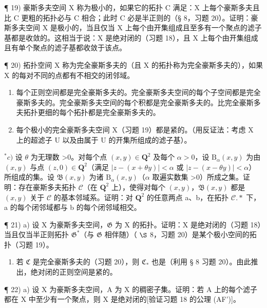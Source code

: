 ¶ 19) 豪斯多夫空间 X 称为极小的，如果它的拓扑 C 满足：X 上每个豪斯多夫且比 C 更粗的拓扑必与 C 相合；此时 C 必是半正则的（§ 8，习题 20）。证明：豪斯多夫空间 X 是极小的，当且仅当 X 上每个由开集组成且至多有一个聚点的滤子基都是收敛的。这相当于说：X 是绝对闭的（习题 18），且 X 上每个由开集组成且有单个聚点的滤子基都收敛于该点。

¶ 20) 拓扑空间 X 称为完全豪斯多夫的（且 X 的拓扑称为完全豪斯多夫的），如果 X 的每对不同的点都有不相交的闭邻域。

\begin{enumerate}
\def\labelenumi{\alph{enumi})}
\item
  每个正则空间都是完全豪斯多夫的。完全豪斯多夫空间的每个子空间都是完全豪斯多夫的。完全豪斯多夫空间的每个积都是完全豪斯多夫的。比完全豪斯多夫拓扑更细的每个拓扑都是完全豪斯多夫的。
\item
  每个极小的完全豪斯多夫空间 X（习题 19）都是紧的。（用反证法：考虑 X 上的超滤子 U 以及由属于 U 的开集所组成的滤子基）。
\end{enumerate}

\(^{*}c)\) 设 \(\theta\) 为无理数 \textgreater0。对每个点 \((x,y)\in\mathbf{Q}^{2}\) 及每个 \(\alpha>0\)，设 \(\mathrm{B}_{\alpha}(x,y)\) 为由 \((x,y)\) 与点 \((z,0)\in\mathbf{Q}^{2}\)（满足 \(|z-(x+\theta y)|<\alpha\) 或 \(|z-(x-\theta y)|<\alpha\)）所组成的集。设 \(\mathfrak{B}(x,y)\) 为诸 \(\mathrm{B}_{\alpha}(x,y)\)（\(\alpha\) 取遍实数集 \textgreater0）所成之集。证明：存在豪斯多夫拓扑 \(\mathcal{C}\)（在 \(\mathbf{Q}^{2}\) 上），使得对每个 \((x,y)\)，\(\mathfrak{B}(x,y)\) 都是 \((x,y)\) 关于 \(\mathcal{C}\) 的基本邻域系。证明：对 \(\mathbf{Q}^{2}\) 的任意两点 a、b，在拓扑 \(\mathcal{C}.*\) 下，a 的每个闭邻域都与 b 的每个闭邻域相交。

¶ 21) a) 设 X 为豪斯多夫空间，\(\mathfrak{G}\) 为 X 的拓扑。证明：X 是绝对闭的（习题 18）当且仅当半正则拓扑 \(\mathfrak{G}^*\)（与 \(\mathfrak{G}\) 相伴随）（ \(\S\) 8，习题 20）是某个极小空间的拓扑（习题 19）。

\begin{enumerate}
\def\labelenumi{\alph{enumi})}
\setcounter{enumi}{1}
\tightlist
\item
  若 \(\mathfrak{C}\) 是完全豪斯多夫的（习题 20），则 \(\mathfrak{C}_{*}\) 也是（利用 § 8 习题 20）。由此推出，绝对闭的正则空间是紧的。
\end{enumerate}

¶ 22) a) 设 X 为豪斯多夫空间，A 为 X 的稠密子集。证明：若 A 上的每个滤子都在 X 中至少有一个聚点，则 X 是绝对闭的{[}验证习题 18 的公理 (AF'){]}。

